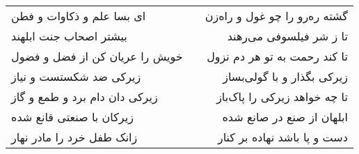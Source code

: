 \begin{center}
\begin{longtable}{l p{0.5cm} r}
ای بسا علم و ذکاوات و فطن
&&
گشته ره‌رو را چو غول و راه‌زن
\\
بیشتر اصحاب جنت ابلهند
&&
تا ز شر فیلسوفی می‌رهند
\\
خویش را عریان کن از فضل و فضول
&&
تا کند رحمت به تو هر دم نزول
\\
زیرکی ضد شکستست و نیاز
&&
زیرکی بگذار و با گولی‌بساز
\\
زیرکی دان دام برد و طمع و گاز
&&
تا چه خواهد زیرکی را پاک‌باز
\\
زیرکان با صنعتی قانع شده
&&
ابلهان از صنع در صانع شده
\\
زانک طفل خرد را مادر نهار
&&
دست و پا باشد نهاده بر کنار
\\
\end{longtable}
\end{center}
